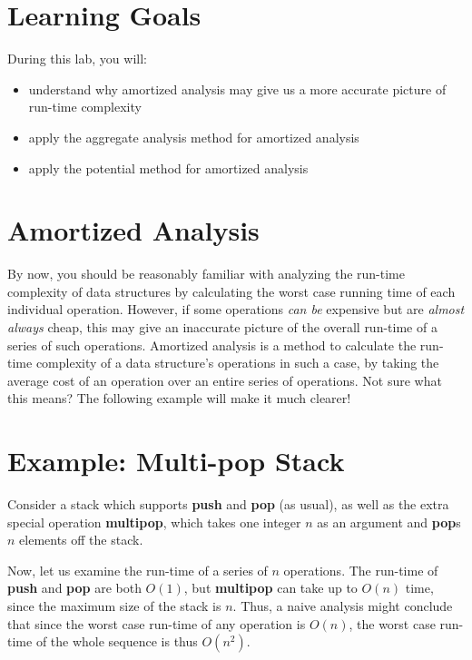


\section*{Learning Goals}
During this lab, you will:
\begin{itemize}
    \item understand why amortized analysis may give us a more accurate picture of run-time complexity
    \item apply the aggregate analysis method for amortized analysis
    \item apply the potential method for amortized analysis
\end{itemize}

\section*{Amortized Analysis}

By now, you should be reasonably familiar with analyzing the run-time complexity of data structures by calculating the worst case running time of each individual operation. However, if some operations \textit{can be} expensive but are \textit{almost always} cheap, this may give an inaccurate picture of the overall run-time of a series of such operations. Amortized analysis is a method to calculate the run-time complexity of a data structure's operations in such a case, by taking the average cost of an operation over an entire series of operations. Not sure what this means? The following example will make it much clearer!

\section*{Example: Multi-pop Stack}

Consider a stack which supports \textbf{push} and \textbf{pop} (as usual), as well as the extra special operation \textbf{multipop}, which takes one integer $n$ as an argument and \textbf{pop}s $n$ elements off the stack. 

Now, let us examine the run-time of a series of $n$ operations. The run-time of \textbf{push} and \textbf{pop} are both $O(1)$, but \textbf{multipop} can take up to $O(n)$ time, since the maximum size of the stack is $n$. Thus, a naive analysis might conclude that since the worst case run-time of any operation is $O(n)$, the worst case run-time of the whole sequence is thus $O(n^2)$.

